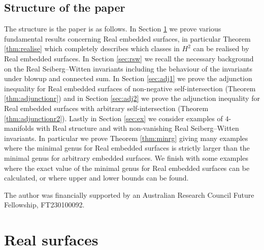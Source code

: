 \documentclass{amsart}
\theoremstyle{definition}
\theoremstyle{remark}
\numberwithin{equation}{section}
\begin{document}
\subsection{Structure of the paper}

The structure is the paper is as follows. In Section \ref{sec:realsurface} we prove various fundamental results concerning Real embedded surfaces, in particular Theorem \ref{thm:realise} which completely describes which classes in $H^2$ can be realised by Real embedded surfaces. In Section \ref{sec:rsw} we recall the necessary background on the Real Seiberg--Witten invariants including the behaviour of the invariants under blowup and connected sum. In Section \ref{sec:adj1} we prove the adjunction inequality for Real embedded surfaces of non-negative self-intersection (Theorem \ref{thm:adjunctionr}) and in Section \ref{sec:adj2} we prove the adjunction inequality for Real embedded surfaces with arbitrary self-intersection (Theorem \ref{thm:adjunctionr2}). Lastly in Section \ref{sec:ex} we consider examples of $4$-manifolds with Real structure and with non-vanishing Real Seiberg--Witten invariants. In particular we prove Theorem \ref{thm:minrg} giving many examples where the minimal genus for Real embedded surfaces is strictly larger than the minimal genus for arbitrary embedded surfaces. We finish with some examples where the exact value of the minimal genus for Real embedded surfaces can be calculated, or where upper and lower bounds can be found.

 The author was financially supported by an Australian Research Council Future Fellowship, FT230100092.




\section{Real surfaces}\label{sec:realsurface}
\end{document}

